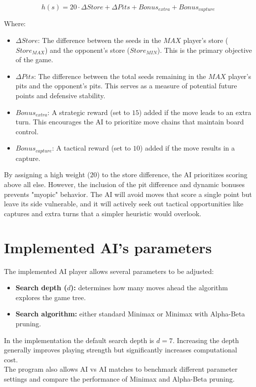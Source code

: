 \documentclass[a4paper,11pt]{article}
\begin{document}
\[
h(s) = 20 \cdot \Delta Store + \Delta Pits + Bonus_{extra} + Bonus_{capture}
\]

Where:
\begin{itemize}
    \item \textbf{$\Delta Store$}: The difference between the seeds in the $MAX$ player's store ($Store_{MAX}$) and the opponent's store ($Store_{MIN}$). This is the primary objective of the game.
    \item \textbf{$\Delta Pits$}: The difference between the total seeds remaining in the $MAX$ player's pits and the opponent's pits. This serves as a measure of potential future points and defensive stability.
    \item \textbf{$Bonus_{extra}$}: A strategic reward (set to $15$) added if the move leads to an extra turn. This encourages the AI to prioritize move chains that maintain board control.
    \item \textbf{$Bonus_{capture}$}: A tactical reward (set to $10$) added if the move results in a capture.
\end{itemize}

By assigning a high weight ($20$) to the store difference, the AI prioritizes scoring above all else. However, the inclusion of the pit difference and dynamic bonuses prevents "myopic" behavior. The AI will avoid moves that score a single point but leave its side vulnerable, and it will actively seek out tactical opportunities like captures and extra turns that a simpler heuristic would overlook.


\section{Implemented AI's parameters}
The implemented AI player allows several parameters to be adjusted:
\begin{itemize}
\item \textbf{Search depth ($d$):} determines how many moves ahead the algorithm explores the game tree.
\item \textbf{Search algorithm:} either standard Minimax or Minimax with Alpha-Beta pruning.
\end{itemize}
In the implementation the default search depth is $d=7$. Increasing the depth generally improves playing strength but significantly increases computational cost. \\
The program also allows AI vs AI matches to benchmark different parameter settings and compare the performance of Minimax and Alpha-Beta pruning.
\end{document}
